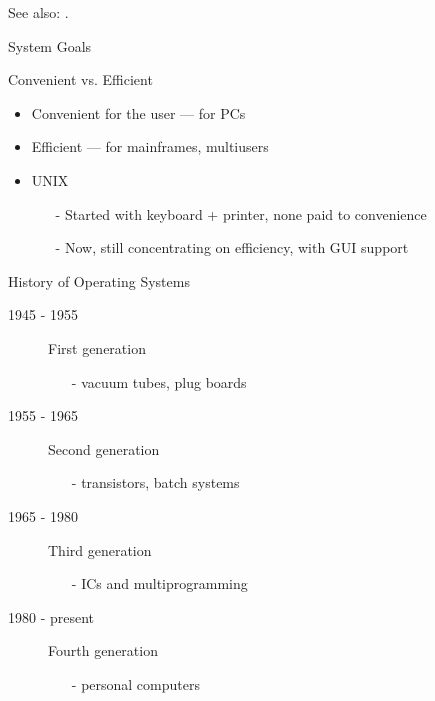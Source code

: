 See also: .

\begin{frame}{System Goals}
  \begin{block}{Convenient vs. Efficient}
    \begin{itemize}
    \item Convenient for the user --- for PCs
    \item Efficient --- for mainframes, multiusers
    \item UNIX
      \begin{itemize}
      \item[-] Started with keyboard + printer, none paid to convenience
      \item[-] Now, still concentrating on efficiency, with GUI support
      \end{itemize}
    \end{itemize}
  \end{block}
\end{frame}

\begin{frame}{History of Operating Systems}
  \begin{center}
  \end{center}
\end{frame}

\begin{frame}
  \begin{description}
  \item[1945 - 1955] First generation 
    \begin{itemize}
    \item[-] vacuum tubes, plug boards
    \end{itemize}
  \item[1955 - 1965] Second generation 
    \begin{itemize}
    \item[-] transistors, batch systems
    \end{itemize}
  \item[1965 - 1980] Third generation 
    \begin{itemize}
    \item[-] ICs and multiprogramming
    \end{itemize}
  \item[1980 - present] Fourth generation 
    \begin{itemize}
    \item[-] personal computers
    \end{itemize}
  \end{description}
\end{frame}

